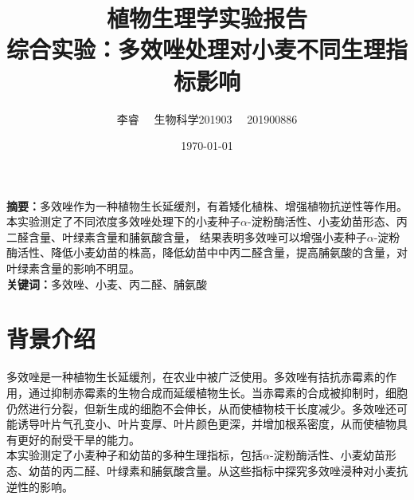 \documentclass[UTF8]{ctexart}
\begin{document}
    \title{植物生理学实验报告\\综合实验：多效唑处理对小麦不同生理指标影响}
    \author{李睿 \ \ 生物科学201903 \ \ 201900886}
    \date{\today{}}
    \maketitle
    \newpage

    \tableofcontents
    \newpage

    \textbf{摘要：}多效唑作为一种植物生长延缓剂，有着矮化植株、增强植物抗逆性等作用。
    本实验测定了不同浓度多效唑处理下的小麦种子$\alpha$-淀粉酶活性、小麦幼苗形态、丙二醛含量、叶绿素含量和脯氨酸含量，
    结果表明多效唑可以增强小麦种子$\alpha$-淀粉酶活性、降低小麦幼苗的株高，降低幼苗中中丙二醛含量，提高脯氨酸的含量，对叶绿素含量的影响不明显。
    \\
    \indent \textbf{关键词：}多效唑、小麦、丙二醛、脯氨酸
    
    

   
    


    \section{背景介绍}
    多效唑是一种植物生长延缓剂，在农业中被广泛使用。多效唑有拮抗赤霉素的作用，通过抑制赤霉素的生物合成而延缓植物生长。当赤霉素的合成被抑制时，细胞仍然进行分裂，但新生成的细胞不会伸长，从而使植物枝干长度减少。多效唑还可能诱导叶片气孔变小、叶片变厚、叶片颜色更深，并增加根系密度，从而使植物具有更好的耐受干旱的能力。
    \\
    \indent 本实验测定了小麦种子和幼苗的多种生理指标，包括$\alpha$-淀粉酶活性、小麦幼苗形态、幼苗的丙二醛、叶绿素和脯氨酸含量。从这些指标中探究多效唑浸种对小麦抗逆性的影响。


    
\end{document}
